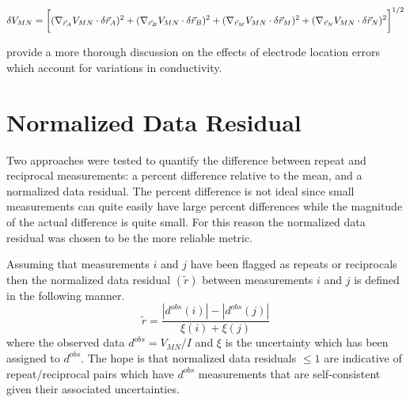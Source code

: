 \documentclass[final,authoryear,5p,times,twocolumn]{elsarticle}
\begin{document}
\begin{equation}
 \delta V_{MN} = \bigg[ (\nabla_{\vec{r}_{A}} V_{MN} \cdot \delta \vec{r}_{A} )^2+ (\nabla_{\vec{r}_{B}} V_{MN} \cdot \delta \vec{r}_{B})^2 + \\ 
 (\nabla_{\vec{r}_{M}} V_{MN} \cdot \delta \vec{r}_{M})^2 + (\nabla_{\vec{r}_{N}} V_{MN} \cdot \delta \vec{r}_{N})^2 \bigg]^{1/2}
\end{equation}

\cite{Oldenborger2005} provide a more thorough discussion on the effects of electrode location errors which account for variations in conductivity.

\section{Normalized Data Residual}
\label{Appen:NDR}
Two approaches were tested to quantify the difference between repeat and reciprocal measurements: a percent difference relative to the mean, and a normalized data residual. The percent difference is not ideal since small measurements can quite easily have large percent differences while the magnitude of the actual difference is quite small. For this reason the normalized data residual was chosen to be the more reliable metric. 

Assuming that measurements $i$ and $j$ have been flagged as repeats or reciprocals then the normalized data residual $\left(\tilde{r}\right)$ between measurements $i$ and $j$ is defined in the following manner. 
\begin{equation}
\label{eq:NormalizedDataResid}
\tilde{r}  = \frac{\left| d^{obs}(i) \right| - \left| d^{obs}(j) \right|}{\xi(i) + \xi(j)}
\end{equation} 
where the observed data $d^{obs} = V_{MN}/I$ and $\xi$ is the uncertainty which has been assigned to $d^{obs}$. The hope is that normalized data residuals $\leq 1$ are indicative of repeat/reciprocal pairs which have $d^{obs}$ measurements that are self-consistent given their associated uncertainties.




\end{document}
